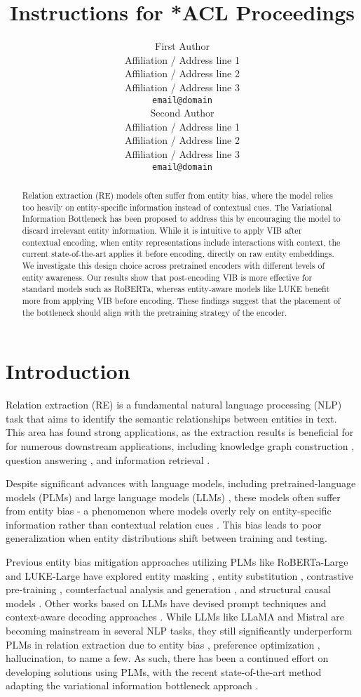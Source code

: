 \documentclass[11pt]{article}
\title{Instructions for *ACL Proceedings}
\author{First Author \\
  Affiliation / Address line 1 \\
  Affiliation / Address line 2 \\
  Affiliation / Address line 3 \\
  \texttt{email@domain} \\\And
  Second Author \\
  Affiliation / Address line 1 \\
  Affiliation / Address line 2 \\
  Affiliation / Address line 3 \\
  \texttt{email@domain} \\}
\begin{document}
\maketitle
\begin{abstract}
Relation extraction (RE) models often suffer from entity bias, where the model relies too heavily on entity-specific information instead of contextual cues. The Variational Information Bottleneck has been proposed to address this by encouraging the model to discard irrelevant entity information. While it is intuitive to apply VIB after contextual encoding, when entity representations include interactions with context, the current state-of-the-art applies it before encoding, directly on raw entity embeddings. We investigate this design choice across pretrained encoders with different levels of entity awareness. Our results show that post-encoding VIB is more effective for standard models such as RoBERTa, whereas entity-aware models like LUKE benefit more from applying VIB before encoding. These findings suggest that the placement of the bottleneck should align with the pretraining strategy of the encoder.
\end{abstract}

\section{Introduction}

Relation extraction (RE) is a fundamental natural language processing (NLP) task that aims to identify the semantic relationships between entities in text. This area has found strong applications, as the extraction results is beneficial for for numerous downstream applications, including knowledge graph construction \cite{}, question answering \cite{}, and information retrieval \cite{}. 

Despite significant advances with language models, including pretrained-language models (PLMs) \cite{} and large language models (LLMs) \cite{}, these models often suffer from entity bias - a phenomenon where models overly rely on entity-specific information rather than contextual relation cues \cite{}. This bias leads to poor generalization when entity distributions shift between training and testing.

Previous entity bias mitigation approaches utilizing PLMs like RoBERTa-Large \cite{} and LUKE-Large \cite{} have explored entity masking \cite{}, entity substitution \cite{}, contrastive pre-training \cite{}, counterfactual analysis and generation \cite{}, and structural causal models \cite{}. Other works based on LLMs have devised prompt techniques \cite{} and context-aware decoding approaches \cite{}. While LLMs like LLaMA \cite{} and Mistral \cite{} are becoming mainstream in several NLP tasks, they still significantly underperform PLMs in relation extraction \cite{} due to entity bias \cite{}, preference optimization \cite{}, hallucination, to name a few. As such, there has been a continued effort on developing solutions using PLMs, with the recent state-of-the-art method \cite{} adapting the variational information bottleneck approach \cite{}.
\end{document}
